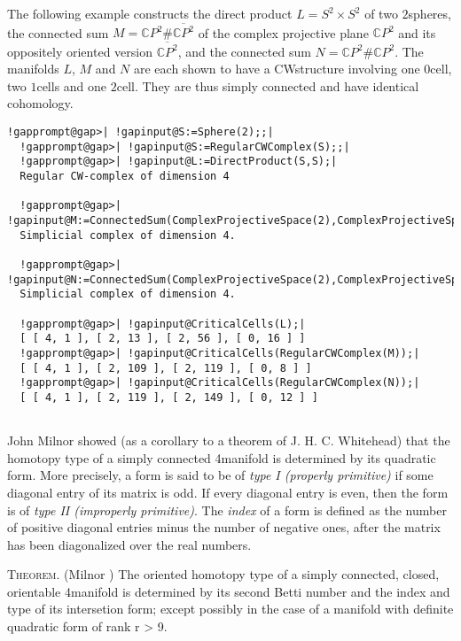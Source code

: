 \documentclass[a4paper,11pt]{report}
\begin{document}
{{The following example constructs the direct product $L=S^2\times S^2$ of two $2$\texttt{}spheres, the connected sum $M=\mathbb CP^2 \# \overline{\mathbb CP^2}$ of the complex projective plane $\mathbb CP^2$ and its oppositely oriented version $\overline{\mathbb CP^2}$, and the connected sum $N=\mathbb CP^2 \# \mathbb CP^2$. The manifolds $L$, $M$ and $N$ are each shown to have a CW\texttt{}structure involving one $0$\texttt{}cell, two $1$\texttt{}cells and one $2$\texttt{}cell. They are thus simply connected and have identical
cohomology. 
\begin{Verbatim}[commandchars=!@|,fontsize=\small,frame=single,label=Example]
  !gapprompt@gap>| !gapinput@S:=Sphere(2);;|
  !gapprompt@gap>| !gapinput@S:=RegularCWComplex(S);;|
  !gapprompt@gap>| !gapinput@L:=DirectProduct(S,S);|
  Regular CW-complex of dimension 4
  
  !gapprompt@gap>| !gapinput@M:=ConnectedSum(ComplexProjectiveSpace(2),ComplexProjectiveSpace(2),-1);|
  Simplicial complex of dimension 4.
  
  !gapprompt@gap>| !gapinput@N:=ConnectedSum(ComplexProjectiveSpace(2),ComplexProjectiveSpace(2),+1);|
  Simplicial complex of dimension 4.
  
  !gapprompt@gap>| !gapinput@CriticalCells(L);|
  [ [ 4, 1 ], [ 2, 13 ], [ 2, 56 ], [ 0, 16 ] ]
  !gapprompt@gap>| !gapinput@CriticalCells(RegularCWComplex(M));|
  [ [ 4, 1 ], [ 2, 109 ], [ 2, 119 ], [ 0, 8 ] ]
  !gapprompt@gap>| !gapinput@CriticalCells(RegularCWComplex(N));|
  [ [ 4, 1 ], [ 2, 119 ], [ 2, 149 ], [ 0, 12 ] ]
  
\end{Verbatim}
 John Milnor showed (as a corollary to a theorem of J. H. C. Whitehead) that
the homotopy type of a simply connected 4\texttt{}manifold is
determined by its quadratic form. More precisely, a form is said to be of \emph{type I (properly primitive)} if some diagonal entry of its matrix is odd. If every diagonal entry is even,
then the form is of \emph{type II (improperly primitive)}. The \emph{index} of a form is defined as the number of positive diagonal entries minus the
number of negative ones, after the matrix has been diagonalized over the real
numbers. 

\textsc{Theorem.} (Milnor \cite{milnor}) The oriented homotopy type of a simply connected, closed, orientable
4\texttt{}manifold is determined by its second Betti number and the
index and type of its intersetion form; except possibly in the case of a
manifold with definite quadratic form of rank r {\textgreater} 9. 

}}
\end{document}
